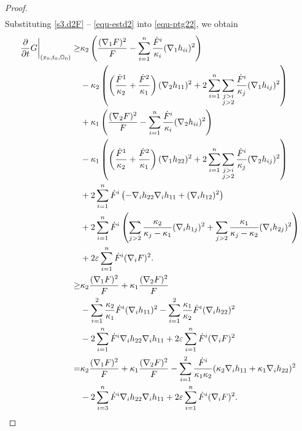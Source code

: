 \documentclass[10pt,a4paper]{amsart}
\begin{document}
\begin{proof}
\begin{align}
    	\label{equ-estd2}
    \end{align}
Substituting \eqref{s3.d2F} -- \eqref{equ-estd2} into \eqref{equ-ptg22}, we obtain
    \begin{align}
    	\left.\dfrac{\partial}{\partial t}G\right|_{(x_0,t_0,\mathbb{O}_0)} \geq & \kappa_2 \left( \dfrac{(\nabla_1 F)^2}{F} - \sum\limits_{i=1}^n \dfrac{\dot{F}^i}{\kappa_i}(\nabla_1 h_{ii})^2 \right)\nonumber\\
        &-\kappa_2\left(\left(\dfrac{\dot{F}^1}{\kappa_2}+\dfrac{\dot{F}^2}{\kappa_1}\right)(\nabla_2 h_{11})^2 + 2 \sum\limits_{i=1}^n\sum\limits_{\substack{j>i\\j>2}}\dfrac{\dot{F}^i}{\kappa_j}(\nabla_1 h_{ij})^2  \right) \nonumber\\
    	& +  \kappa_1 \left( \dfrac{(\nabla_2 F)^2}{F} - \sum\limits_{i=1}^n \dfrac{\dot{F}^i}{\kappa_{i}}(\nabla_2 h_{ii})^2\right)\nonumber\\
        &-\kappa_1\left( \left(\dfrac{\dot{F}^1}{\kappa_2}+\dfrac{\dot{F}^2}{\kappa_1}\right)(\nabla_1 h_{22})^2 + 2 \sum\limits_{i=1}^n\sum\limits_{\substack{j>i\\j>2}}\dfrac{\dot{F}^i}{\kappa_j}(\nabla_2 h_{ij})^2 \right) \notag\\
    	& + 2\sum\limits_{i=1}^n \dot{F}^i \left( -\nabla_i h_{22}\nabla_i h_{11} + (\nabla_i h_{12})^2 \right) \notag\\
    	& + 2 \sum\limits_{i=1}^n \dot{F}^{i}\left( \sum\limits_{j>2}\dfrac{\kappa_2}{\kappa_j-\kappa_1}(\nabla_i h_{1j})^2 +\sum\limits_{j>2}\dfrac{\kappa_1}{\kappa_j-\kappa_2}(\nabla_i h_{2j})^2 \right) \notag\\
    	& + 2\varepsilon \sum\limits_{i=1}^n \dot{F}^i (\nabla_i F)^2. \notag\\
    	\geq & \kappa_2\dfrac{(\nabla_1 F)^2}{F} + \kappa_1 \dfrac{(\nabla_2 F)^2}{F} \nonumber\\
        &- \sum\limits_{i=1}^2 \dfrac{\kappa_2}{\kappa_1}\dot{F}^i (\nabla_i h_{11})^2 - \sum\limits_{i=1}^2 \dfrac{\kappa_1}{\kappa_2}\dot{F}^i (\nabla_i h_{22})^2 \nonumber\\
    	& - 2 \sum\limits_{i=1}^n \dot{F}^i \nabla_i h_{22}\nabla_i h_{11} + 2\varepsilon \sum\limits_{i=1}^n \dot{F}^i (\nabla_i F)^2 \nonumber\\
    	= & \kappa_2 \dfrac{(\nabla_1 F)^2}{F} + \kappa_1 \dfrac{(\nabla_2 F)^2}{F} - \sum\limits_{i=1}^2 \dfrac{\dot{F}^i}{\kappa_1 \kappa_2}(\kappa_2 \nabla_i h_{11}+ \kappa_1 \nabla_i h_{22})^2 \nonumber\\
    	& - 2 \sum\limits_{i=3}^n \dot{F}^i \nabla_i h_{22}\nabla_i h_{11} + 2\varepsilon \sum\limits_{i=1}^n \dot{F}^i (\nabla_i F)^2.  \label{equ-2ndgauss2}
    \end{align}
    

\end{proof}
\end{document}
